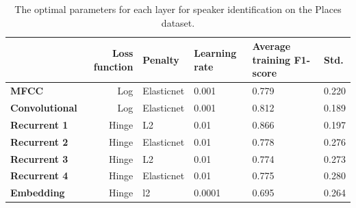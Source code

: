 \documentclass[a4paper, oneside]{book}
\begin{document}
\begin{table}[H]
\begin{center}
\begin{tabular}{|l|r|l|l|l|l|}
\hline              & \bf Loss function     & \bf Penalty & \bf Learning rate   & \bf Average training F1-score & \bf Std. \\ \hline
\bf MFCC            & Log                   &  Elasticnet & 0.001               & 0.779                         & 0.220 \\
\bf Convolutional   & Log                   &  Elasticnet & 0.001               & 0.812                         & 0.189 \\ 
\bf Recurrent 1     & Hinge                 &  L2         & 0.01                & 0.866                         & 0.197 \\
\bf Recurrent 2     & Hinge                 &  Elasticnet & 0.01                & 0.778                         & 0.276 \\
\bf Recurrent 3     & Hinge                 &  L2         & 0.01                & 0.774                         & 0.273 \\
\bf Recurrent 4     & Hinge                 &  Elasticnet & 0.01                & 0.775                         & 0.280 \\
\bf Embedding       & Hinge                 &  l2         & 0.0001              & 0.695                         & 0.264 \\
\hline
\end{tabular}
\end{center}
\caption{\label{table:speaker-identification-on-places-dataset} The optimal parameters for each layer for speaker identification on the Places dataset.  }
\end{table}
\end{document}
